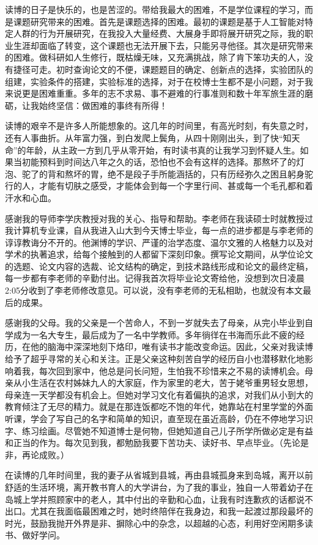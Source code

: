 读博的日子是快乐的，也是苦涩的。带给我最大的困难，不是学位课程的学习，而是课题研究带来的困难。首先是课题选择的困难。最初的课题是基于人工智能对特定人群的行为开展研究，在我投入大量经费、大展身手即将展开研究之际，我的职业生涯却面临了转变，这个课题也无法开展下去，只能另寻他径。其次是研究带来的困难。做科研如人生修行，既枯燥无味，又充满挑战，除了肯下笨功夫的人，没有捷径可走。初时查询论文的不便，课题题目的确定、创新点的选择，实验团队的组建，实验条件的搭建，实验标准的选择，对于在校博士生都不是小问题，对于我来说更是困难重重。多年的志不求易、事不避难的行事准则和数十年军旅生涯的磨砺，让我始终坚信：做困难的事终有所得！

读博的艰辛不是许多人所能想象的。这几年的时间里，有高光时刻，有失意之时，还有人事曲折。从年富力强，到白发爬上鬓角，从四十刚刚出头，到了快“知天命”的年龄，从主政一方到几乎从零开始，有时读书真的让我学习到怀疑人生。如果当初能预料到时间达八年之久的话，恐怕也不会有这样的选择。那熬坏了的灯泡、驼了的背和熬坏的胃，绝不是段子手所能涵括的，只有历经弥久之困且躬身驼行的人，才能有切肤之感受，才能体会到每一个字里行间、甚或每一个毛孔都和着汗水和心血。

感谢我的导师李学庆教授对我的关心、指导和帮助。李老师在我读硕士时就教授过我计算机专业课，自从我进入山大到今天博士毕业，每一点的进步都是与李老师的谆谆教诲分不开的。他渊博的学识、严谨的治学态度、温尔文雅的人格魅力以及对学术的执著追求，给每个接触到的人都留下深刻印象。撰写论文期间，从学位论文的选题、论文内容的选裁、论文结构的确定，到技术路线形成和论文的最终定稿，每一步都有李老师的辛勤付出。记得我首次将毕业论文寄给他，没想到次日凌晨2:05分收到了李老师修改意见。可以说，没有李老师的无私相助，也就没有本文最后的成果。

感谢我的父母。我的父亲是一个苦命人，不到一岁就失去了母亲，从完小毕业到自学成为一名大专生，最后成为了一名中学教师。多年徜徉在书海而乐此不疲的经历，在他的脑海中深深地刻下烙印，唯有读书才能改变命运。因此，父亲对我读博给予了超乎寻常的关心和关注。正是父亲这种刻苦自学的经历自小也潜移默化地影响着我，每次回到家中，他总是问长问短，生怕我不珍惜来之不易的读博机会。母亲从小生活在农村姊妹九人的大家庭，作为家里的老大，苦于姥爷重男轻女思想，母亲连一天学都没有机会上。但她对学习文化有着偏执的追求，对我们从小到大的教育倾注了无尽的精力。就是在那连饭都吃不饱的年代，她靠站在村里学堂的外面听课，学会了写自己的名字和简单的知识，直至现在虽近高龄，仍在不停地学习识字、练习绘画。尽管她不知道博士是何物，但她知道自己儿子所学所做必定是有益和正当的作为。每次见到我，都勉励我要下苦功夫、读好书、早点毕业。（先论是非，再论成败。）

在读博的几年时间里，我的妻子从省城到县城，再由县城孤身来到岛城，离开以前舒适的生活环境，离开教书育人的大学讲台，为了我的事业，独自一人带着幼子在岛城上学并照顾家中的老人，其中付出的辛勤和心血，让我有时连歉疚的话都说不出口。尤其在我面临最困难之时，她时终陪伴在我身边，和我一起渡过那段最坏的时光，鼓励我抛开外界是非、摒除心中的杂念，以超越的心态，利用好空闲期多读书、做好学问。

